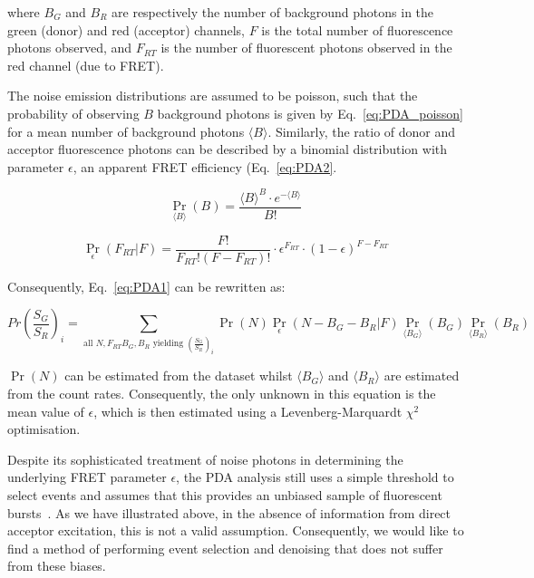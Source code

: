 where $B_G$ and $B_R$ are respectively the number of background photons in the green (donor) and red (acceptor) channels, $F$ is the total number of fluorescence photons observed, and $F_{RT}$ is the number of fluorescent photons observed in the red channel (due to FRET).

The noise emission distributions are assumed to be poisson, such that the probability of observing $B$ background photons is given by Eq.~\ref{eq:PDA_poisson} for a mean number of background photons $\langle B \rangle$. Similarly, the ratio of donor and acceptor fluorescence photons can be described by a binomial distribution with parameter $\epsilon$, an apparent FRET efficiency (Eq.~\ref{eq:PDA2}.

\begin{equation}
\Pr_{\langle B \rangle}(B)  = \frac{\langle B \rangle^B \cdot e^{-\langle B \rangle}}{B!}
\label{eq:PDA_poisson}
\end{equation}

\begin{equation}
\Pr_{\epsilon}(F_{RT}|F) = \frac{F!}{F_{RT}! (F - F_{RT})!} \cdot \epsilon^{F_{RT}} \cdot (1 - \epsilon)^{F - F_{RT}}
\label{eq:PDA2}
\end{equation}

Consequently, Eq.~\ref{eq:PDA1} can be rewritten as: 

\begin{equation}
Pr (\frac{S_G}{S_R})_i = \sum \limits_{\text{all $N, F_{RT} B_G, B_R$ yielding $(\frac{S_G}{S_R})_i$}} \Pr(N) \Pr_{\epsilon}(N - B_G - B_R| F) \Pr_{\langle B_G \rangle}(B_G) \Pr_{\langle B_R \rangle}(B_R)
\label{eq:PDA3}
\end{equation}

$\Pr(N)$ can be estimated from the dataset whilst $\langle B_G \rangle$ and $\langle B_R \rangle$ are estimated from the count rates. Consequently, the only unknown in this equation is the mean value of $\epsilon$, which is then estimated using a Levenberg-Marquardt $\chi^2$ optimisation.

Despite its sophisticated treatment of noise photons in determining the underlying FRET parameter $\epsilon$, the PDA analysis still uses a simple threshold to select events and assumes that this provides an unbiased sample of fluorescent bursts~\cite{kalinin2007, antonik2006}. As we have illustrated above, in the absence of information from direct acceptor excitation, this is not a valid assumption. Consequently, we would like to find a method of performing event selection and denoising that does not suffer from these biases.  


